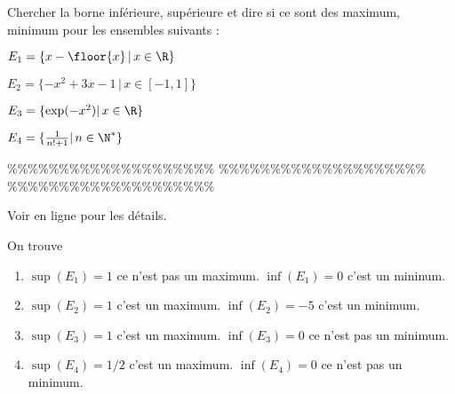 



\begin{exercice}
Chercher la borne inférieure, supérieure et dire si ce sont des maximum, minimum pour les ensembles suivants : 

\begin{enumerate}
\begin{minipage}[t]{0.45\textwidth}
\item $E_1= \{ x- \floor{x}\, |\, x\in \R\}$
\item $E_2= \{ -x^2+3x -1\, |\, x\in [-1,1]\}$

\end{minipage}
\begin{minipage}[t]{0.45\textwidth}
\item $E_3= \{\exp(-x^2) |\, x\in \R \}$
\item $E_4= \{\frac{1}{n!+1}|\, n\in \N^* \}$
\end{minipage}
\end{enumerate}

\end{exercice}


\%\%\%\%\%\%\%\%\%\%\%\%\%\%\%\%\%\%\%\%
\%\%\%\%\%\%\%\%\%\%\%\%\%\%\%\%\%\%\%\%
\%\%\%\%\%\%\%\%\%\%\%\%\%\%\%\%\%\%\%\%




\begin{correction}
Voir en ligne pour les détails. 

On trouve 
\begin{enumerate}
	\item $\sup(E_1) =1$ ce n'est pas un maximum. $\inf(E_1)= 0$ c'est un mininum.
	\item $\sup(E_2)= 1$ c'est un maximum. $\inf(E_2)=-5$ c'est un minimum.
	\item $\sup(E_3) =1$ c'est un maximum. $\inf(E_3) = 0$ ce n'est pas un minimum. 
	\item $\sup(E_4)=1/2$ c'est un maximum. $\inf(E_4)=0$ ce n'est pas un minimum. 
\end{enumerate}
\end{correction}